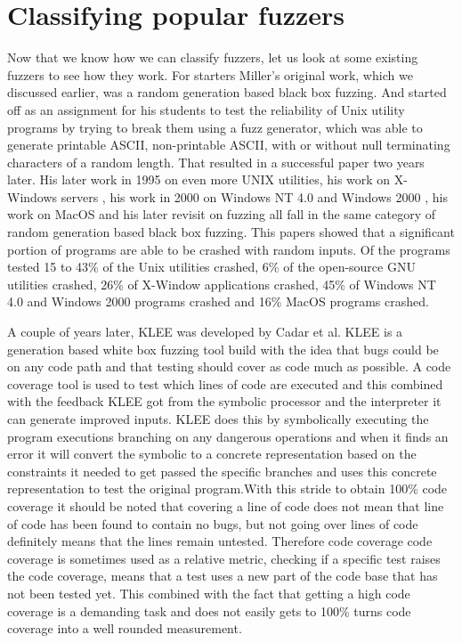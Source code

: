 \section{Classifying popular fuzzers}
\label{fuzzing:OtherFuzzers}
Now that we know how we can classify fuzzers, let us look at some existing fuzzers to see how they work. For starters Miller's original work, which we discussed earlier, was a random generation based black box fuzzing. And started off as an assignment for his students to test the reliability of Unix utility programs by trying to break them using a fuzz generator, which was able to generate printable ASCII, non-printable ASCII, with or without null terminating characters of a random length. That resulted in a successful paper \cite{4originalFuzzingUnixUtils} two years later. His later work in 1995 on even more UNIX utilities, his work on X-Windows servers \cite{26miller1995fuzzrevisited}, his work in 2000 on Windows NT 4.0 and Windows 2000 \cite{24MillerWindows}, his work on MacOS \cite{25MillerOnMacOS} and his later revisit \cite{3miller2020relevanceOfClasicalFuzzTesting} on fuzzing all fall in the same category of random generation based black box fuzzing. This papers showed that a significant portion of programs are able to be crashed with random inputs. Of the programs tested 15 to 43\% of the Unix utilities crashed, 6\% of the open-source GNU utilities crashed, 26\% of X-Window applications crashed, 45\% of Windows NT 4.0 and Windows 2000 programs crashed and 16\% MacOS programs crashed.

A couple of years later, KLEE \cite{8KLEE} was developed by Cadar et al. KLEE is a generation based white box fuzzing tool build with the idea that bugs could be on any code path and that testing should cover as code much as possible. A code coverage tool is used to test which lines of code are executed and this combined with the feedback KLEE got from the symbolic processor and the interpreter it can generate improved inputs. KLEE does this by symbolically executing the program executions branching on any dangerous operations and when it finds an error it will convert the symbolic to a concrete representation based on the constraints it needed to get passed the specific branches and uses this concrete representation to test the original program.With this stride to obtain 100\% code coverage it should be noted that covering a line of code does not mean that line of code has been found to contain no bugs, but not going over lines of code definitely means that the lines remain untested. Therefore code coverage code coverage is sometimes used as a relative metric, checking if a specific test raises the code coverage, means that a test uses a new part of the code base that has not been tested yet. This combined with the fact that getting a high code coverage is a demanding task and does not easily gets to 100\% turns code coverage into a well rounded measurement.

